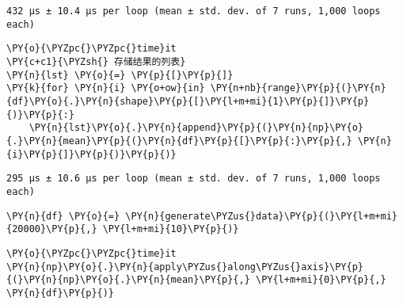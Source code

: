     \begin{Verbatim}[commandchars=\\\{\}]
432 µs ± 10.4 µs per loop (mean ± std. dev. of 7 runs, 1,000 loops each)
    \end{Verbatim}

    \begin{tcolorbox}[breakable, size=fbox, boxrule=1pt, pad at break*=1mm,colback=cellbackground, colframe=cellborder]
\begin{Verbatim}[commandchars=\\\{\}]
\PY{o}{\PYZpc{}\PYZpc{}time}it
\PY{c+c1}{\PYZsh{} 存储结果的列表}
\PY{n}{lst} \PY{o}{=} \PY{p}{[}\PY{p}{]}
\PY{k}{for} \PY{n}{i} \PY{o+ow}{in} \PY{n+nb}{range}\PY{p}{(}\PY{n}{df}\PY{o}{.}\PY{n}{shape}\PY{p}{[}\PY{l+m+mi}{1}\PY{p}{]}\PY{p}{)}\PY{p}{:}
    \PY{n}{lst}\PY{o}{.}\PY{n}{append}\PY{p}{(}\PY{n}{np}\PY{o}{.}\PY{n}{mean}\PY{p}{(}\PY{n}{df}\PY{p}{[}\PY{p}{:}\PY{p}{,} \PY{n}{i}\PY{p}{]}\PY{p}{)}\PY{p}{)}
\end{Verbatim}
\end{tcolorbox}

    \begin{Verbatim}[commandchars=\\\{\}]
295 µs ± 10.6 µs per loop (mean ± std. dev. of 7 runs, 1,000 loops each)
    \end{Verbatim}

    \begin{tcolorbox}[breakable, size=fbox, boxrule=1pt, pad at break*=1mm,colback=cellbackground, colframe=cellborder]
\begin{Verbatim}[commandchars=\\\{\}]
\PY{n}{df} \PY{o}{=} \PY{n}{generate\PYZus{}data}\PY{p}{(}\PY{l+m+mi}{20000}\PY{p}{,} \PY{l+m+mi}{10}\PY{p}{)}
\end{Verbatim}
\end{tcolorbox}

    \begin{tcolorbox}[breakable, size=fbox, boxrule=1pt, pad at break*=1mm,colback=cellbackground, colframe=cellborder]
\begin{Verbatim}[commandchars=\\\{\}]
\PY{o}{\PYZpc{}\PYZpc{}time}it
\PY{n}{np}\PY{o}{.}\PY{n}{apply\PYZus{}along\PYZus{}axis}\PY{p}{(}\PY{n}{np}\PY{o}{.}\PY{n}{mean}\PY{p}{,} \PY{l+m+mi}{0}\PY{p}{,} \PY{n}{df}\PY{p}{)}
\end{Verbatim}
\end{tcolorbox}

